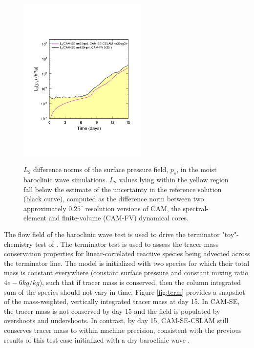 \documentclass[twocol]{ametsoc}
\begin{document}
\begin{figure}[t]
\noindent\includegraphics[width=15pc,angle=0]{figs/temp_l2.pdf}\\
\caption{$L_2$ difference norms of the surface pressure field, $p_s$, in the moist baroclinic wave simulations. $L_2$ values lying within the yellow region fall below the estimate of the uncertainty in the reference solution (black curve), computed as the difference norm between two approximately $0.25^\circ$ resolution versions of CAM, the spectral-element and finite-volume (CAM-FV) dynamical cores.}
\label{fig:norm}
\end{figure}

{\color{red}The flow field of the baroclinic wave test is used to drive the terminator "toy"-chemistry test of \cite{LCLVT2015GMD}. The terminator test is used to assess the tracer mass conservation properties for linear-correlated reactive species being advected across the terminator line. The model is initialized with two species for which their total mass is constant everywhere (constant surface pressure and constant mixing ratio $4e-6 kg/kg$), such that if tracer mass is conserved, then the column integrated sum of the species should not vary in time. Figure \ref{fig:term} provides a snapshot of the mass-weighted, vertically integrated tracer mass at day 15. In CAM-SE, the tracer mass is not conserved by day 15 and the field is populated by overshoots and undershoots. In contrast, by day 15, CAM-SE-CSLAM still conserves tracer mass to within machine precision, consistent with the previous results of this test-case initialized with a dry baroclinic wave \citep{LTOUNGK2017MWR}.{}} 
\end{document}
